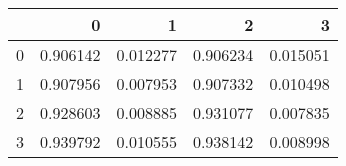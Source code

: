 \begin{tabular}{lrrrr}
\toprule
{} &         0 &         1 &         2 &         3 \\
\midrule
0 &  0.906142 &  0.012277 &  0.906234 &  0.015051 \\
1 &  0.907956 &  0.007953 &  0.907332 &  0.010498 \\
2 &  0.928603 &  0.008885 &  0.931077 &  0.007835 \\
3 &  0.939792 &  0.010555 &  0.938142 &  0.008998 \\
\bottomrule
\end{tabular}
